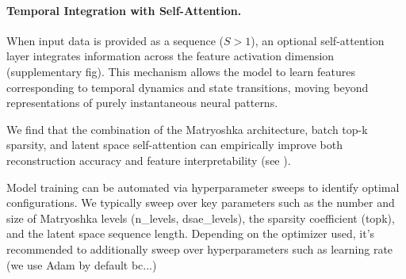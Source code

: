\paragraph{Temporal Integration with Self-Attention.}
When input data is provided as a sequence ($S>1$), an optional self-attention layer integrates information across the feature activation dimension (supplementary fig). This mechanism allows the model to learn features corresponding to temporal dynamics and state transitions, moving beyond representations of purely instantaneous neural patterns.

We find that the combination of the Matryoshka architecture, batch top-k sparsity, and latent space self-attention can empirically improve both reconstruction accuracy and feature interpretability (see ).

Model training can be automated via hyperparameter sweeps to identify optimal configurations. We typically sweep over key parameters such as the number and size of Matryoshka levels (n\_levels, dsae\_levels), the sparsity coefficient (topk), and the latent space sequence length. Depending on the optimizer used, it's recommended to additionally sweep over hyperparameters such as learning rate (we use Adam by default bc...)

